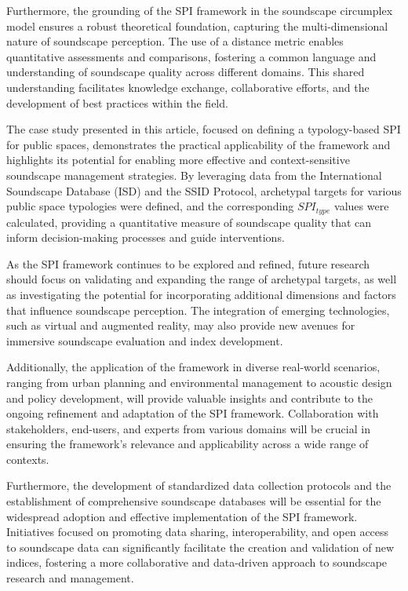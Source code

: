 \documentclass[
  authoryear,
  preprint,
  3p]{elsarticle}
\begin{document}
Furthermore, the grounding of the SPI framework in the soundscape
circumplex model ensures a robust theoretical foundation, capturing the
multi-dimensional nature of soundscape perception. The use of a distance
metric enables quantitative assessments and comparisons, fostering a
common language and understanding of soundscape quality across different
domains. This shared understanding facilitates knowledge exchange,
collaborative efforts, and the development of best practices within the
field.

The case study presented in this article, focused on defining a
typology-based SPI for public spaces, demonstrates the practical
applicability of the framework and highlights its potential for enabling
more effective and context-sensitive soundscape management strategies.
By leveraging data from the International Soundscape Database (ISD) and
the SSID Protocol, archetypal targets for various public space
typologies were defined, and the corresponding \(SPI_{type}\) values
were calculated, providing a quantitative measure of soundscape quality
that can inform decision-making processes and guide interventions.

As the SPI framework continues to be explored and refined, future
research should focus on validating and expanding the range of
archetypal targets, as well as investigating the potential for
incorporating additional dimensions and factors that influence
soundscape perception. The integration of emerging technologies, such as
virtual and augmented reality, may also provide new avenues for
immersive soundscape evaluation and index development.

Additionally, the application of the framework in diverse real-world
scenarios, ranging from urban planning and environmental management to
acoustic design and policy development, will provide valuable insights
and contribute to the ongoing refinement and adaptation of the SPI
framework. Collaboration with stakeholders, end-users, and experts from
various domains will be crucial in ensuring the framework's relevance
and applicability across a wide range of contexts.

Furthermore, the development of standardized data collection protocols
and the establishment of comprehensive soundscape databases will be
essential for the widespread adoption and effective implementation of
the SPI framework. Initiatives focused on promoting data sharing,
interoperability, and open access to soundscape data can significantly
facilitate the creation and validation of new indices, fostering a more
collaborative and data-driven approach to soundscape research and
management.
\end{document}
